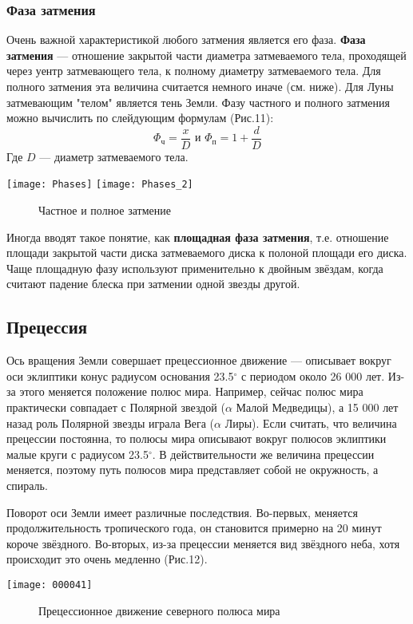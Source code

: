\documentclass[10pt,a5paper]{article}
\begin{document}
\subsubsection{Фаза затмения}
Очень важной характеристикой любого затмения является его фаза. \textbf{Фаза затмения} --- отношение закрытой части диаметра затмеваемого тела, проходящей через уентр затмевающего тела, к полному диаметру затмеваемого тела. Для полного затмения эта величина считается немного иначе (см. ниже). Для Луны затмевающим "телом" является тень Земли. Фазу частного и полного затмения можно вычислить по слейдующим формулам (Рис.11):
$$\Phi_{\text{ч}}=\frac{x}{D} \text{ и } \Phi_{\text{п}}=1+\frac{d}{D}$$
Где $D$ --- диаметр затмеваемого тела.
\begin{center}
\texttt{[image: Phases]}
\texttt{[image: Phases\_2]}
\begin{figure}[h!]
\caption{Частное и полное затмение}
\end{figure}
\end{center}

Иногда вводят такое понятие, как \textbf{площадная фаза затмения}, т.е. отношение площади закрытой части диска затмеваемого диска к полоной площади его диска. Чаще площадную фазу используют применительно к двойным звёздам, когда считают падение блеска при затмении одной звезды другой.
\subsection{Прецессия}

Ось вращения Земли совершает прецессионное движение --- описывает вокруг оси эклиптики  конус радиусом основания 23.5$^\circ$ с периодом около 26 000 лет. Из-за этого меняется положение полюс мира. Например, сейчас полюс мира практически совпадает с Полярной звездой ($\alpha$ Малой Медведицы), а 15 000 лет назад роль Полярной звезды играла Вега ($\alpha$ Лиры). Если считать, что величина прецессии постоянна, то полюсы мира описывают вокруг полюсов эклиптики малые круги с радиусом 23.5$^\circ$. В действительности же величина прецессии меняется, поэтому путь полюсов мира представляет собой не окружность, а спираль.

Поворот оси Земли имеет различные последствия. Во-первых, меняется продолжительность тропического года, он становится примерно на 20 минут короче звёздного. Во-вторых, из-за прецессии меняется вид звёздного неба, хотя происходит это очень медленно (Рис.12).
\begin{center}
\texttt{[image: 000041]}
\begin{figure}[h!]
\caption{Прецессионное движение северного полюса мира}
\end{figure}
\end{center}
\end{document}
